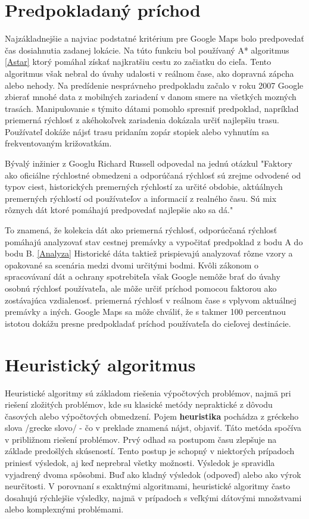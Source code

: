 \documentclass[10pt,slovak,a4paper]{article}
\begin{document}
\section{Predpokladaný príchod}\label{ETA}
Najzákladnejšie a najviac podstatné kritérium pre Google Maps bolo predpovedať čas dosiahnutia zadanej lokácie. Na túto funkciu bol používaný A* algoritmus \ref{Astar} ktorý pomáhal získať najkratšiu cestu zo začiatku do cieľa. Tento algoritmus však nebral do úvahy udalosti v reálnom čase, ako dopravná zápcha alebo nehody. Na predídenie nesprávneho predpokladu začalo v roku 2007 Google zbierať mnohé data z mobilných zariadení v danom smere na všetkých mozných trasách. Manipulovanie s týmito dátami pomohlo spresniť predpoklad, napríklad priemerná rýchlosť z akéhokoľvek zariadenia dokázala určiť najlepšiu trasu. Používateľ dokáže nájsť trasu pridaním zopár stopiek alebo vyhnutím sa  frekventovaným križovatkám. 
\par 
Bývalý inžinier z Googlu Richard Russell odpovedal na jednú otázkul "Faktory ako oficiálne rýchlostné obmedzeni a odporúčaná rýchlosť sú zrejme odvodené od typov ciest, historických premerných rýchlostí za určité obdobie, aktúálnych premerných rýchlostí od používateľov a informacií z realného času. Sú mix rôznych dát ktoré pomáhajú predpovedať najlepšie ako sa dá."
\par
To znamená, že kolekcia dát ako priemerná rýchlosť, odporúcčaná rýchlosť pomáhajú analyzovať stav cestnej premávky a vypočitať predpoklad z bodu A do bodu B. \ref{Analyza} Historické dáta taktiež prispievajú analyzovať rôzne vzory a opakované sa scenária medzi dvomi určitými bodmi. Kvôli zákonom o spracovávaní dát a ochrany spotrebiteľa však Google nemôže brať do úvahy osobnú rýchlosť používateľa, ale môže určiť príchod pomocou faktorou ako zostávajúca vzdialenosť. priemerná rýchlosť v reálnom čase s vplyvom aktuálnej premávky a iných. Google Maps sa môže chváliť, že s takmer 100 percentnou istotou dokážu presne predpokladať príchod používateľa do cieľovej destinácie.
\section{Heuristický algoritmus} \label{heuristika}
Heuristické algoritmy sú základom riešenia výpočtových problémov, najmä pri riešení zložitých problémov, kde su klasické metódy nepraktické z dôvodu časových alebo výpočtových obmedzení.\cite{Heuristika}
Pojem \textbf{heuristika} pochádza z gréckeho slova /grecke slovo/ - čo v preklade znamená nájst, objaviť. Táto metóda spočíva v približnom riešení problémov. Prvý odhad sa postupom času zlepšuje na základe predošlých skúseností. Tento postup je schopný v niektorých prípadoch priniesť výsledok, aj keď neprebral všetky možnosti. Výsledok je spravidla vyjadrený dvoma spôsobmi. Buď ako kladný výsledok (odpoveď) alebo ako výrok neurčitosti.
V porovnaní s exaktnými algoritmami, heuristické algoritmy často dosahujú rýchlejšie výsledky, najmä v prípadoch s veľkými dátovými množstvami alebo komplexnými problémami. \cite{Heuristika2}\cite{HeuristikaA}
\end{document}
